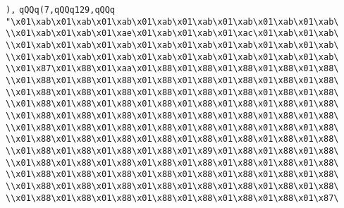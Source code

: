 \verb|),|\newline
\verb|qQQq(7,qQQq129,qQQq|\newline
\verb|"\x01\xab\x01\xab\x01\xab\x01\xab\x01\xab\x01\xab\x01\xab\x01\xab\|\newline
\verb|\\x01\xab\x01\xab\x01\xae\x01\xab\x01\xab\x01\xac\x01\xab\x01\xab\|\newline
\verb|\\x01\xab\x01\xab\x01\xab\x01\xab\x01\xab\x01\xab\x01\xab\x01\xab\|\newline
\verb|\\x01\xab\x01\xab\x01\xab\x01\xab\x01\xab\x01\xab\x01\xab\x01\xab\|\newline
\verb|\\x01\x87\x01\x88\x01\xaa\x01\x88\x01\x88\x01\x88\x01\x88\x01\x88\|\newline
\verb|\\x01\x88\x01\x88\x01\x88\x01\x88\x01\x88\x01\x88\x01\x88\x01\x88\|\newline
\verb|\\x01\x88\x01\x88\x01\x88\x01\x88\x01\x88\x01\x88\x01\x88\x01\x88\|\newline
\verb|\\x01\x88\x01\x88\x01\x88\x01\x88\x01\x88\x01\x88\x01\x88\x01\x88\|\newline
\verb|\\x01\x88\x01\x88\x01\x88\x01\x88\x01\x88\x01\x88\x01\x88\x01\x88\|\newline
\verb|\\x01\x88\x01\x88\x01\x88\x01\x88\x01\x88\x01\x88\x01\x88\x01\x88\|\newline
\verb|\\x01\x88\x01\x88\x01\x88\x01\x88\x01\x88\x01\x88\x01\x88\x01\x88\|\newline
\verb|\\x01\x88\x01\x88\x01\x88\x01\x88\x01\x89\x01\x88\x01\x88\x01\x88\|\newline
\verb|\\x01\x88\x01\x88\x01\x88\x01\x88\x01\x88\x01\x88\x01\x88\x01\x88\|\newline
\verb|\\x01\x88\x01\x88\x01\x88\x01\x88\x01\x88\x01\x88\x01\x88\x01\x88\|\newline
\verb|\\x01\x88\x01\x88\x01\x88\x01\x88\x01\x88\x01\x88\x01\x88\x01\x88\|\newline
\verb|\\x01\x88\x01\x88\x01\x88\x01\x88\x01\x88\x01\x88\x01\x88\x01\x87\|\newline
